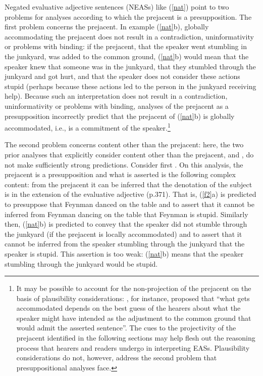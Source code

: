\documentclass[11pt,fleqn]{article}
\newcommand{\6}{\mbox{$[\hspace*{-.6mm}[$}}
\newcommand{\9}{\mbox{$]\hspace*{-.6mm}]$}}
\begin{document}
Negated evaluative adjective sentences (NEASs) like (\ref{nat}) point to two problems for analyses according to which the prejacent is a presupposition. The first problem concerns the prejacent. In example (\ref{nat}b), globally accommodating the prejacent does not result in a contradiction, uninformativity or problems with binding: if the prejacent, that the speaker went stumbling in the junkyard, was added to the common ground, (\ref{nat}b) would mean that the speaker knew that someone was in the junkyard, that they stumbled through the junkyard and got hurt, and that the speaker does not consider these actions stupid (perhaps because these actions led to the person in the junkyard receiving help). Because such an interpretation does not result in a contradiction, uninformativity or problems with binding, analyses of the prejacent as a presupposition incorrectly  predict that the prejacent of (\ref{nat}b) is globally accommodated, i.e., is a commitment of the speaker.\footnote{It may be possible to account for the non-projection of the prejacent on the basis of plausibility considerations: \citealt[162]{vonfintel08}, for instance,  proposed that ``what gets accommodated depends on the best guess of the hearers about what the speaker might have intended as the adjustment to the common ground that would admit the asserted sentence''. The cues to the projectivity of the prejacent identified in the following sections may help flesh out the reasoning process that hearers and readers undergo in interpreting EASs. Plausibility considerations do not, however, address the second problem that presuppositional analyses face.}

The second problem concerns content other than the prejacent: here, the two prior analyses that explicitly consider content other than the prejacent, \citealt{oshima09b} and \citealt{barker02}, do not make sufficiently strong predictions. Consider first \citealt{oshima09b}. On this analysis, the prejacent is a presupposition and what is asserted is the following complex content: from the prejacent it can be inferred that the denotation of the subject is in the extension of the evaluative adjective (p.371). That is, (\ref{f2}a) is predicted to presuppose that Feynman danced on the table and to assert that it cannot be inferred from Feynman dancing on the table that Feynman is stupid. Similarly then, (\ref{nat}b) is predicted to convey that the speaker did not stumble through the junkyard (if the prejacent is locally accommodated) and to assert that it cannot be inferred from the speaker stumbling through the junkyard that the speaker is stupid. This assertion is too weak: (\ref{nat}b) means that the speaker stumbling through the junkyard would be stupid. 
\end{document}
